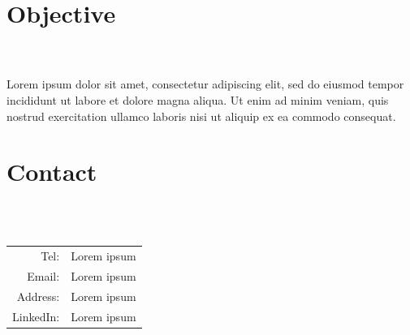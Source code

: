 \documentclass{resume_template}
\begin{document}
\begin{tcolorbox}[colframe=white,colback=white,arc=0mm]
	\hspace*{-0.236in}
	\begin{minipage}[t]{3in}
		\vspace*{-0.125in}
		\begin{tcolorbox}[colframe=secondary,colback=secondary,arc=0mm,height=8.405in]
			\section*{Objective}
			\vspace*{-0.2in}
			\hrulefill\\\\
				Lorem ipsum dolor sit amet, consectetur adipiscing elit, sed do eiusmod tempor incididunt ut labore et dolore magna aliqua. Ut enim ad minim veniam, quis nostrud exercitation ullamco laboris nisi ut aliquip ex ea commodo consequat. 		
			\section*{Contact}
			\vspace*{-0.2in}
			\hrulefill\\\\
			\begin{tabular}{r l}
				Tel: & Lorem ipsum \\
				Email: & Lorem ipsum \\
				Address: & Lorem ipsum \\
				LinkedIn: & Lorem ipsum \\		
			\end{tabular}

\end{tcolorbox}
\end{minipage}
\end{tcolorbox}
\end{document}
